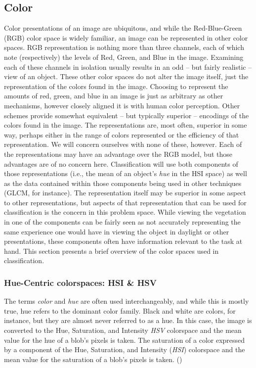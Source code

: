 \documentclass[letterpaper]{article}
\begin{document}
{\subsection{Color}
Color presentations of an image are ubiquitous, and while the Red-Blue-Green (RGB) color space is widely familiar, an image can be represented in other color spaces. RGB representation is nothing more than three channels, each of which note (respectively) the levels of Red, Green, and Blue in the image.  Examining each of these channels in isolation usually results in an odd -- but fairly realistic -- view of an object. These other color spaces do not alter the image itself, just the representation of the colors found in the image.  Choosing to represent the amounts of red, green, and blue in an image is just as arbitrary as other mechanisms, however closely aligned it is with human color perception. Other schemes provide somewhat equivalent -- but typically superior -- encodings of the colors found in the image. The representations are, most often, superior in some way, perhaps either in the range of colors represented or the efficiency of that representation. We will concern ourselves with none of these, however. Each of the representations may have an advantage over the RGB model, but those advantages are of no concern here. Classification will use both components of those representations (i.e., the mean of an object's \textit{hue} in the HSI space) as well as the data contained within those components being used in other techniques (GLCM, for instance). The representation itself may be superior in some aspect to other representations, but aspects of that representation that can be used for classification is the concern in this problem space. While viewing the vegetation in one of the components can be fairly seen as not accurately representing the same experience one would have in viewing the object in daylight or other presentations, these components often have information relevant to the task at hand. This section presents a brief overview of the color spaces used in classification.

\subsubsection{Hue-Centric colorspaces: HSI \& HSV}
The terms {\it color} and {\it hue} are often used interchangeably, and while this is mostly true, hue refers to the dominant color family. Black and white are colors, for instance, but they are almost never referred to as a hue. In this case, the image is converted to the Hue, Saturation, and Intensity {\it HSV} colorspace and the mean value for the hue of a blob's pixels is taken. The saturation of a color expressed by a component of the Hue, Saturation, and Intensity ({\it HSI}) colorspace and the mean value for the saturation of a blob's pixels is taken. (\cite{Forsyth2012-hy})

}
\end{document}
